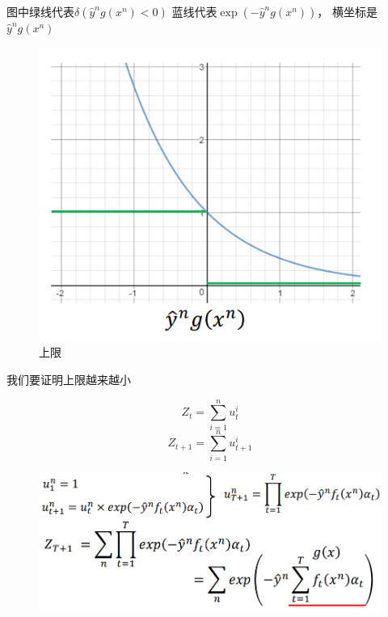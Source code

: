 图中绿线代表$\delta(\hat{y}^n g(x^n) < 0)$
蓝线代表$\exp(-\hat{y}^n g(x^n))$， 横坐标是$\hat{y}^n g(x^n)$

\begin{figure}[H]
    \centerline{\includegraphics[scale=0.5]{Part1/Chapter/images/upperband.png}}
    \caption{上限}
\end{figure}

我们要证明上限越来越小

\begin{equation*}
    Z_t = \sum_{i=1}^n u_t^i
\end{equation*}
\begin{equation*}
    Z_{t+1} = \sum_{i=1}^n u_{t+1}^i
\end{equation*}

\begin{figure}[H]
    \centerline{\includegraphics[scale=0.3]{Part1/Chapter/images/zt+1.png}}
\end{figure}

